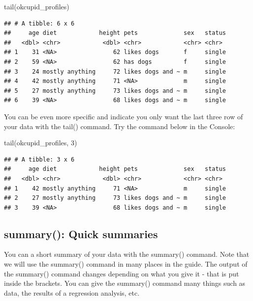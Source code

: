 \documentclass[
]{krantz}
\makeatletter
\newenvironment{Shaded}{\begin{snugshade}}{\end{snugshade}}
\newcommand{\DecValTok}[1]{\textcolor[rgb]{0.06,0.06,0.06}{#1}}
\newcommand{\FunctionTok}[1]{\textcolor[rgb]{0,0,0}{#1}}
\newcommand{\NormalTok}[1]{#1}
\newenvironment{kframe}{%
\medskip{}
\setlength{\fboxsep}{.8em}
 \def\at@end@of@kframe{}%
 \ifinner\ifhmode%
  \def\at@end@of@kframe{\end{minipage}}%
  \begin{minipage}{\columnwidth}%
 \fi\fi%
 \def\FrameCommand##1{\hskip\@totalleftmargin \hskip-\fboxsep
 \colorbox{shadecolor}{##1}\hskip-\fboxsep
     \hskip-\linewidth \hskip-\@totalleftmargin \hskip\columnwidth}%
 \MakeFramed {\advance\hsize-\width
   \@totalleftmargin\z@ \linewidth\hsize
   \@setminipage}}%
 {\par\unskip\endMakeFramed%
 \at@end@of@kframe}
\renewenvironment{Shaded}{\begin{kframe}}{\end{kframe}}
\makeatother
\begin{document}
\begin{Shaded}
\begin{Highlighting}[]
\FunctionTok{tail}\NormalTok{(okcupid\_profiles)}
\end{Highlighting}
\end{Shaded}

\begin{verbatim}
## # A tibble: 6 x 6
##     age diet            height pets             sex   status
##   <dbl> <chr>            <dbl> <chr>            <chr> <chr> 
## 1    31 <NA>                62 likes dogs       f     single
## 2    59 <NA>                62 has dogs         f     single
## 3    24 mostly anything     72 likes dogs and ~ m     single
## 4    42 mostly anything     71 <NA>             m     single
## 5    27 mostly anything     73 likes dogs and ~ m     single
## 6    39 <NA>                68 likes dogs and ~ m     single
\end{verbatim}

You can be even more specific and indicate you only want the last three row of your data with the tail() command. Try the command below in the Console:

\begin{Shaded}
\begin{Highlighting}[]
\FunctionTok{tail}\NormalTok{(okcupid\_profiles, }\DecValTok{3}\NormalTok{)}
\end{Highlighting}
\end{Shaded}

\begin{verbatim}
## # A tibble: 3 x 6
##     age diet            height pets             sex   status
##   <dbl> <chr>            <dbl> <chr>            <chr> <chr> 
## 1    42 mostly anything     71 <NA>             m     single
## 2    27 mostly anything     73 likes dogs and ~ m     single
## 3    39 <NA>                68 likes dogs and ~ m     single
\end{verbatim}

\hypertarget{summary-quick-summaries}{%
\subsection{summary(): Quick summaries}\label{summary-quick-summaries}}

You can a short summary of your data with the summary() command. Note that we will use the summary() command in many places in the guide. The output of the summary() command changes depending on what you give it - that is put inside the brackets. You can give the summary() command many things such as data, the results of a regression analysis, etc.
\end{document}
